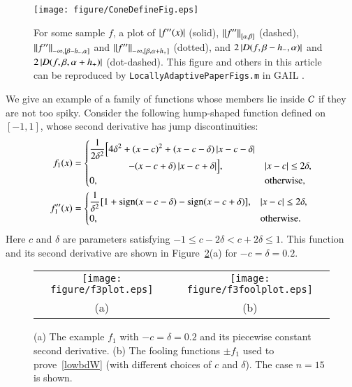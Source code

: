 \documentclass[review]{elsarticle}
\theoremstyle{definition}
\begin{document}
\begin{figure}
	\centering
	\texttt{[image: figure/ConeDefineFig.eps]}
	\caption{For some sample $f$, a plot of $\abs{f''(x)}$ (solid),
	$\norm[{[\alpha,\beta]}]{f''}$ (dashed),
   $\norm[-\infty,{[\beta - h_-,\alpha]}]{f''}$ and $\norm[-\infty,{[\beta,
    \alpha+h_+]}]{f''}$ (dotted), and
    $2\abs{D(f,\beta - h_-,\alpha)}$ and $2\abs{D(f,\beta,\alpha+h_+)}$ (dot-dashed).
    This figure and others in this article can be reproduced by
    \texttt{LocallyAdaptivePaperFigs.m} in GAIL \cite{ChoEtal15a}.
    \label{fig:ConeDef}}
\end{figure}

We give an example of a family of functions whose members lie
inside $\cc$ if they are not too spiky.
Consider the following hump-shaped function defined on $[-1,1]$, whose
second derivative has jump discontinuities:
\begin{align} \label{f3def}
f_1(x) & = \begin{cases} \displaystyle
   \frac{1}{2\delta^2} \Bigl [4 \delta^2 + (x-c)^2 + (x-c-\delta)\abs{x-c-\delta}
\\ \qquad \qquad
    - (x-c+\delta)\abs{x-c+\delta} \Bigr ], & \abs{x-c} \le 2\delta,
\\ 0, & \text{otherwise},
\end{cases}
\\ \nonumber
f''_1(x) & =
\begin{cases} \displaystyle
    \frac{1}{\delta^2} [1 + \sign(x-c-\delta) - \sign(x-c+\delta)], & \abs{x-c} \le 2\delta,
\\ 0, & \text{otherwise}.
\end{cases}
\end{align}
Here $c$ and $\delta$ are parameters satisfying $-1 \le c-2 \delta < c+ 2\delta
\le 1$. This function and its second derivative are shown in Figure~\ref{f3fig}(a)
for $-c=\delta = 0.2$.


\begin{figure}[tb]
\centering
\begin{tabular}{cc}
\texttt{[image: figure/f3plot.eps]}
& \texttt{[image: figure/f3foolplot.eps]}
\\[1ex] (a) & (b)
\end{tabular}
\caption{(a) The example $f_1$ with $-c=\delta = 0.2$ and its piecewise constant
second derivative.
(b) The fooling functions $\pm f_1$ used to prove~\eqref{lowbdW} (with different choices
of $c$ and $\delta$). The case
$n=15$ is shown. \label{f3fig}}
\end{figure}
\end{document}
